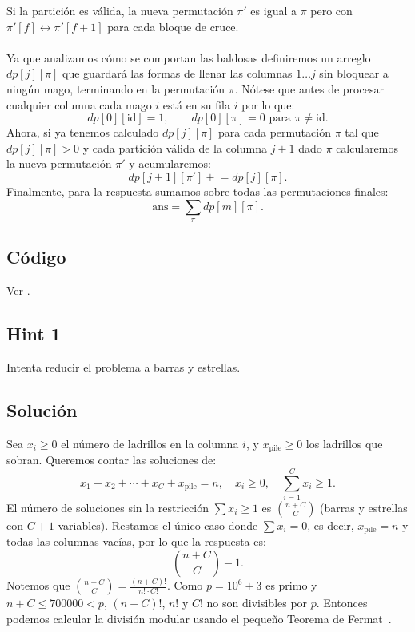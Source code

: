 Si la partición es válida, la nueva permutación $\pi'$ es igual a
$\pi$ pero con $\pi'[f] \leftrightarrow \pi'[f+1]$ para cada bloque
de cruce.
\\\\
Ya que analizamos cómo se comportan las baldosas definiremos un arreglo $dp[j][\pi]$ que guardará las formas de llenar las columnas $1 \ldots j$ sin bloquear a ningún mago, terminando en la permutación $\pi$. Nótese que antes de procesar cualquier columna cada mago $i$ está en su fila $i$ por lo que:
\[
dp[0][\text{id}] = 1, \qquad dp[0][\pi] = 0 \text{ para } \pi \neq \text{id}.
\]
Ahora, si ya tenemos calculado $dp[j][\pi]$ para cada permutación $\pi$ tal que $dp[j][\pi]>0$ y cada partición válida de la columna $j+1$ dado $\pi$ calcularemos la nueva permutación $\pi'$ y acumularemos:
\[
dp[j+1][\pi'] \mathrel{+}= dp[j][\pi].
\]
 Finalmente, para la respuesta sumamos sobre todas las permutaciones finales:
\[
\text{ans} = \sum_{\pi} dp[m][\pi].
\]

\subsection*{Código}
Ver .

\subsection*{Hint 1}
Intenta reducir el problema a barras y estrellas.
\subsection*{Solución}
Sea $x_i \geq 0$ el número de ladrillos en la columna $i$, y $x_{\text{pile}} \geq 0$ los ladrillos que sobran. Queremos contar las soluciones de:
\[
x_1 + x_2 + \cdots + x_C + x_{\text{pile}} = n,
\quad x_i \geq 0,
\quad \sum_{i=1}^{C} x_i \geq 1.
\]
El número de soluciones sin la restricción $\sum x_i \geq 1$ es $\binom{n+C}{C}$ (barras y estrellas con $C+1$ variables). Restamos el único caso donde $\sum x_i = 0$, es decir, $x_{\text{pile}} = n$ y todas las columnas vacías, por lo que la respuesta es:
\[
\binom{n+C}{C} - 1.
\]
Notemos que $\binom{n+C}{C} = \frac{(n+C)!}{n! \cdot C!}$. Como $p = 10^6+3$ es primo y $n+C \leq 700000 < p$, $(n+C)!$, $n!$ y $C!$ no son divisibles por $p$. Entonces podemos calcular la división modular usando el pequeño Teorema de Fermat~\cite{perez_numeros}.

